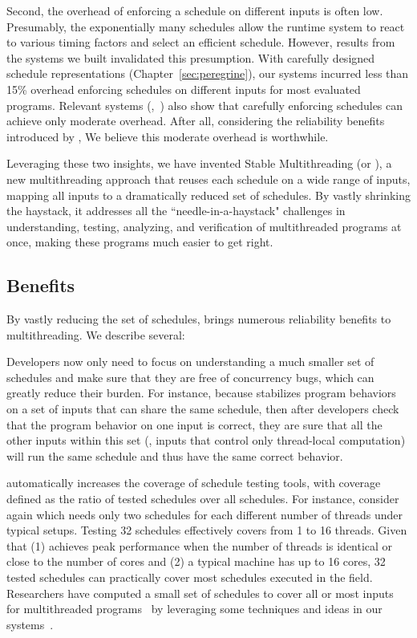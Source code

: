 Second, the overhead of enforcing a schedule on different inputs is often low.
Presumably, the exponentially many schedules allow the
runtime system to react to various timing factors and select an
efficient schedule.  However, results from the \smt systems we built
invalidated this presumption.  With carefully designed schedule
representations (Chapter~\ref{sec:peregrine}), our systems incurred less than
15\%
overhead enforcing schedules on different inputs for most evaluated programs.
Relevant systems (\eg,~\cite{kendo:asplos09, determinator:osdi10}) also show
that
carefully enforcing schedules can achieve only moderate overhead. After all,
considering the reliability benefits introduced by \smt, We believe
this moderate overhead is worthwhile.

Leveraging these two insights, we have invented Stable Multithreading (or \smt),
a new multithreading approach that reuses each schedule on a wide range of
inputs, mapping all inputs to a dramatically reduced set of schedules.
By vastly shrinking the haystack, it addresses all the ``needle-in-a-haystack"
challenges in understanding, testing, analyzing, and verification of
multithreaded programs at once, making these programs much easier to get
right.

\subsection{Benefits}

By vastly reducing the set of schedules, \smt brings numerous reliability
benefits to multithreading.  We describe several:

 Developers now only need to focus on understanding a much
smaller set of schedules and make sure that they are free of concurrency bugs, 
which
can greatly reduce their burden. For instance, because \smt stabilizes program
behaviors on a set of inputs that can share the same schedule, then
after developers check that the program behavior on one input is correct, they
are sure that all the other inputs within this set (\eg, inputs that control
only thread-local computation) will run the same schedule and thus have the same
correct behavior.

 \smt automatically
increases the coverage of schedule testing tools, with coverage
defined as the ratio of tested schedules over all schedules.
For instance, consider \pbzip again which needs only two
schedules for each different number of threads under typical setups.  Testing 32
schedules effectively covers from 1 to 16 threads.  Given that (1) \pbzip
achieves peak performance when the number of threads is identical or close to
the number of cores and (2) a typical machine has up to 16 cores, 32 tested
schedules can practically cover most schedules executed in the field.
Researchers have computed a small set of schedules to cover all or most
inputs for multithreaded programs~\cite{bergan:oopsla13} by leveraging some
techniques and ideas in our \smt systems~\cite{cui:tern:osdi10,
peregrine:sosp11}.

